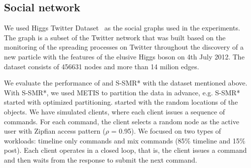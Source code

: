\subsection{Social network}

We used Higgs Twitter Dataset~\cite{snapnets} as the social graphs used in the experiments. 
The graph is a subset of the Twitter network that was built based on the monitoring of the spreading
processes on Twitter throughout the discovery of a new particle with the features of the elusive 
Higgs boson on 4th July 2012. The dataset consists of 456631 nodes and more than 14 milion edges.

We evaluate the performance of \dynastar and S-SMR* with the dataset mentioned above. With S-SMR*, we used
METIS to partition the data in advance, e.g. S-SMR* started with optimized partitioning. \dynastar started with
the random locations of the objects. We have simulated clients, where each client issues a sequence of commands.  
For each command, the client selects a random node as the active user with Zipfian access pattern ($\rho$ = 0.95).
We focused on two types of workloads: timeline only commands and mix commands (85\% timeline and 15\% post). 
Each client operates in a closed loop, that is, the client issues a command and then waits from the response to submit the next command.


%

